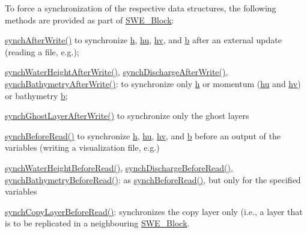 To force a synchronization of the respective data structures, the following methods are provided as part of \hyperlink{classSWE__Block}{S\+W\+E\+\_\+\+Block}\+:
\begin{DoxyItemize}
\item \hyperlink{classSWE__Block_ae914f9bf6d4ef8f974f9f005114985e7}{synch\+After\+Write()} to synchronize \hyperlink{classSWE__Block_a64a0f8f437f38b5f3b8ec5b4abdb864e}{h}, \hyperlink{classSWE__Block_aec2c1278fdb23f083216d8d397f26060}{hu}, \hyperlink{classSWE__Block_a0897aa3c2d78749f209c95e08196d831}{hv}, and \hyperlink{classSWE__Block_af7487209129f40b26ea171762754a261}{b} after an external update (reading a file, e.\+g.);
\item \hyperlink{classSWE__Block_aa2924833e29a795d8c04fb79bfe794de}{synch\+Water\+Height\+After\+Write()}, \hyperlink{classSWE__Block_a94c34030153178c9d94f3f14be174eaf}{synch\+Discharge\+After\+Write()}, \hyperlink{classSWE__Block_a4bece8aa90f67e55c40b91aab900febb}{synch\+Bathymetry\+After\+Write()}\+: to synchronize only \hyperlink{classSWE__Block_a64a0f8f437f38b5f3b8ec5b4abdb864e}{h} or momentum (\hyperlink{classSWE__Block_aec2c1278fdb23f083216d8d397f26060}{hu} and \hyperlink{classSWE__Block_a0897aa3c2d78749f209c95e08196d831}{hv}) or bathymetry \hyperlink{classSWE__Block_af7487209129f40b26ea171762754a261}{b};
\item \hyperlink{classSWE__Block_a4657993ebdb5f0132b077e63790d0b2b}{synch\+Ghost\+Layer\+After\+Write()} to synchronize only the ghost layers
\item \hyperlink{classSWE__Block_a23d936cb9a4367092e5b2515f81fe819}{synch\+Before\+Read()} to synchronize \hyperlink{classSWE__Block_a64a0f8f437f38b5f3b8ec5b4abdb864e}{h}, \hyperlink{classSWE__Block_aec2c1278fdb23f083216d8d397f26060}{hu}, \hyperlink{classSWE__Block_a0897aa3c2d78749f209c95e08196d831}{hv}, and \hyperlink{classSWE__Block_af7487209129f40b26ea171762754a261}{b} before an output of the variables (writing a visualization file, e.\+g.)
\item \hyperlink{classSWE__Block_a07c85681ab29106c3b164db969899ace}{synch\+Water\+Height\+Before\+Read()}, \hyperlink{classSWE__Block_a3773dcb194212fb8cb40ab8465575aa1}{synch\+Discharge\+Before\+Read()}, \hyperlink{classSWE__Block_a7c8258c6949518ca44f4e9ce89d33b09}{synch\+Bathymetry\+Before\+Read()}\+: as \hyperlink{classSWE__Block_a23d936cb9a4367092e5b2515f81fe819}{synch\+Before\+Read()}, but only for the specified variables
\item \hyperlink{classSWE__Block_a13c90d5a6596336013c41e73c8795f83}{synch\+Copy\+Layer\+Before\+Read()}\+: synchronizes the copy layer only (i.\+e., a layer that is to be replicated in a neighbouring \hyperlink{classSWE__Block}{S\+W\+E\+\_\+\+Block}.
\end{DoxyItemize}

